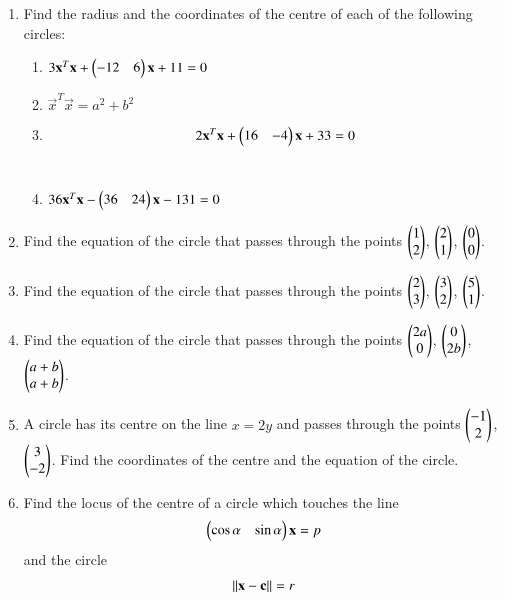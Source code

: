 \renewcommand{\theequation}{\theenumi}
\begin{enumerate}[label=\arabic*.,ref=\thesubsection.\theenumi]
\item Find the radius and the coordinates of the centre of each of the following circles:
\begin{enumerate}
\item
$
3\mathbf{x}^T\mathbf{x}+\begin{pmatrix}-12 & 6\end{pmatrix}\mathbf{x} + 11 = 0
$
\\
\solution

\item
$
\vec{x}^T\vec{x} = a^2+b^2
$
\item
\begin{align}
  2\mathbf{x}^T\mathbf{x}+\begin{pmatrix}16&-4\end{pmatrix}\mathbf{x}+33 = 0 \label{eq:solutions/4/1/1/c/eq1}
\end{align}
\\
\solution

\item
$
36\mathbf{x}^T\mathbf{x}-\begin{pmatrix}36 & 24\end{pmatrix}\mathbf{x}-131=0
$
\end{enumerate}
\item Find the equation of the circle that passes through the points $\begin{pmatrix}1\\2\end{pmatrix}$, $\begin{pmatrix}2\\1\end{pmatrix}$, $\begin{pmatrix}0\\0\end{pmatrix}$.
\\
\solution

\item Find the equation of the circle that passes through  the points $\begin{pmatrix}2\\3\end{pmatrix}$, $\begin{pmatrix}3\\2\end{pmatrix}$, $\begin{pmatrix}5\\1\end{pmatrix}$.
\\
\solution

\item Find the equation of the circle that passes through the points $\begin{pmatrix}2a\\0\end{pmatrix}$, $\begin{pmatrix}0\\2b\end{pmatrix}$, $\begin{pmatrix}a+b\\a+b\end{pmatrix}$.
\\
\solution

\item A circle has its centre on the line $x=2y$ and passes through the points $\begin{pmatrix}-1\\2\end{pmatrix}$, $\begin{pmatrix}3\\-2\end{pmatrix}$.  Find the coordinates
of the centre and the equation of the circle.
\\
\solution

\item Find the locus of the centre of a circle which touches the line 
\begin{align}
\begin{pmatrix}\cos\alpha  & \sin\alpha\end{pmatrix}\mathbf{x} =p
\end{align}
 and the circle 
\begin{align}
\left\lVert\mathbf{x}-\mathbf{c}\right\rVert = r
\end{align}
\end{enumerate}
